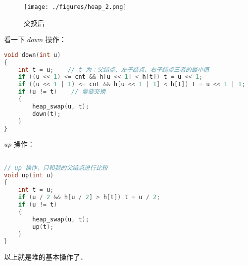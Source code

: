 \begin{figure}[ht]
\centering
\texttt{[image: ./figures/heap\_2.png]}
\caption{交换后} \label{heap_fig2}
\end{figure}


看一下 $down$ 操作：

\begin{lstlisting}[language=cpp]
void down(int u)
{
    int t = u;    // t 为：父结点、左子结点、右子结点三者的最小值
    if ((u << 1) <= cnt && h[u << 1] < h[t]) t = u << 1;
    if ((u << 1 | 1) <= cnt && h[u << 1 | 1] < h[t]) t = u << 1 | 1;
    if (u != t)    // 需要交换
    {
        heap_swap(u, t);
        down(t);
    }
}
\end{lstlisting}

$up$ 操作：

\begin{lstlisting}[language=cpp]

// up 操作，只和我的父结点进行比较
void up(int u)
{
    int t = u;
    if (u / 2 && h[u / 2] > h[t]) t = u / 2;
    if (u != t)
    {
        heap_swap(u, t);
        up(t);
    }
}
\end{lstlisting}

以上就是堆的基本操作了．